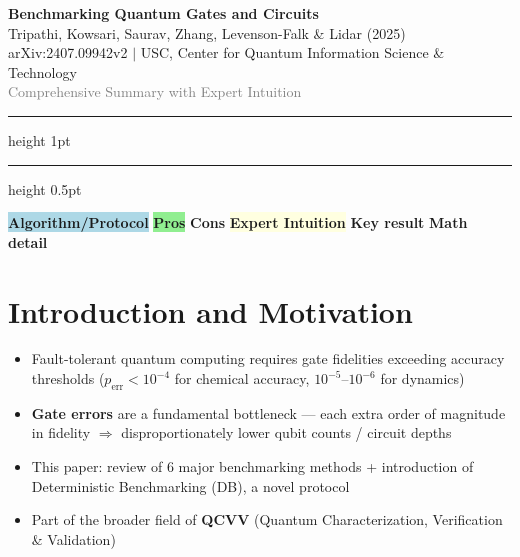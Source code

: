 \documentclass[10pt,a4paper]{article}
\begin{document}
\begin{center}
{\LARGE\bfseries\textcolor{deepblue}{Benchmarking Quantum Gates and Circuits}}\\[4pt]
{\normalsize Tripathi, Kowsari, Saurav, Zhang, Levenson-Falk \& Lidar (2025)}\\[2pt]
{\small arXiv:2407.09942v2 $\mid$ USC, Center for Quantum Information Science \& Technology}\\[6pt]
{\small\textcolor{gray}{Comprehensive Summary with Expert Intuition}}
\end{center}
\vspace{4pt}
\hrule height 1pt
\vspace{8pt}

\tableofcontents
\vspace{6pt}
\hrule height 0.5pt

\vspace{4pt}
\begin{center}
\small
\colorbox{lightblue}{\textcolor{deepblue}{\textbf{Algorithm/Protocol}}} \quad
\colorbox{lightgreen}{\textcolor{progreen}{\textbf{Pros}}} \quad
\colorbox{lightred}{\textcolor{conred}{\textbf{Cons}}} \quad
\colorbox{lightyellow}{\textcolor{keyorange}{\textbf{Expert Intuition}}} \quad
\textcolor{alertred}{\textbf{Key result}} \quad
\textcolor{mathpurple}{\textbf{Math detail}}
\end{center}

\newpage

\section{Introduction and Motivation}

\begin{itemize}
  \item Fault-tolerant quantum computing requires \textcolor{alertred}{gate fidelities exceeding accuracy thresholds} ($p_{\text{err}} < 10^{-4}$ for chemical accuracy, $10^{-5}\text{--}10^{-6}$ for dynamics)
  \item \textbf{Gate errors} are a fundamental bottleneck --- each extra order of magnitude in fidelity $\Rightarrow$ disproportionately lower qubit counts / circuit depths
  \item This paper: review of \textcolor{deepblue}{6 major benchmarking methods} + introduction of \textcolor{alertred}{Deterministic Benchmarking (DB)}, a novel protocol
  \item Part of the broader field of \textbf{QCVV} (Quantum Characterization, Verification \& Validation)
\end{itemize}
\end{document}
